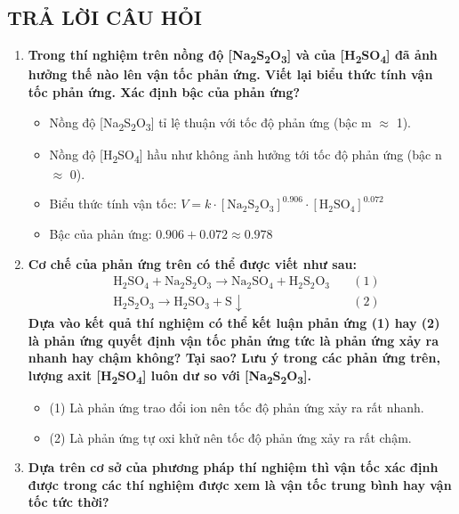 \subsection{TRẢ LỜI CÂU HỎI}
\begin{enumerate}
    \item \textbf{Trong thí nghiệm trên nồng độ [Na\textsubscript{2}S\textsubscript{2}O\textsubscript{3}] và của [H\textsubscript{2}SO\textsubscript{4}] đã ảnh hưởng thế nào lên vận tốc phản ứng. Viết lại biểu thức tính vận tốc phản ứng. Xác định bậc của phản ứng?}
    \begin{itemize}
        \item Nồng độ [Na\textsubscript{2}S\textsubscript{2}O\textsubscript{3}] tỉ lệ thuận với tốc độ phản ứng (bậc m $\approx$ 1).
        \item Nồng độ [H\textsubscript{2}SO\textsubscript{4}] hầu như không ảnh hưởng tới tốc độ phản ứng (bậc n $\approx$ 0).
        \item Biểu thức tính vận tốc: $V = k \cdot [\text{Na}_2\text{S}_2\text{O}_3]^{0.906} \cdot [\text{H}_2\text{SO}_4]^{0.072}$
        \item Bậc của phản ứng: $0.906 + 0.072 \approx 0.978$
    \end{itemize}
    \item \textbf{Cơ chế của phản ứng trên có thể được viết như sau:}
    \begin{align}
        &\text{H}_2\text{SO}_4 + \text{Na}_2\text{S}_2\text{O}_3 \rightarrow \text{Na}_2\text{SO}_4 + \text{H}_2\text{S}_2\text{O}_3 \quad &(1) \nonumber \\
        &\text{H}_2\text{S}_2\text{O}_3 \rightarrow \text{H}_2\text{SO}_3 + \text{S}\downarrow \quad &(2) \nonumber
    \end{align}
    \textbf{Dựa vào kết quả thí nghiệm có thể kết luận phản ứng (1) hay (2) là phản ứng quyết định vận tốc phản ứng tức là phản ứng xảy ra nhanh hay chậm không? Tại sao? Lưu ý trong các phản ứng trên, lượng axit [H\textsubscript{2}SO\textsubscript{4}] luôn dư so với [Na\textsubscript{2}S\textsubscript{2}O\textsubscript{3}].}
    \begin{itemize}
        \item (1) Là phản ứng trao đổi ion nên tốc độ phản ứng xảy ra rất nhanh.
        \item (2) Là phản ứng tự oxi khử nên tốc độ phản ứng xảy ra rất chậm.
    \end{itemize}
    \item \textbf{Dựa trên cơ sở của phương pháp thí nghiệm thì vận tốc xác định được trong các thí nghiệm được xem là vận tốc trung bình hay vận tốc tức thời?}

\end{enumerate}
